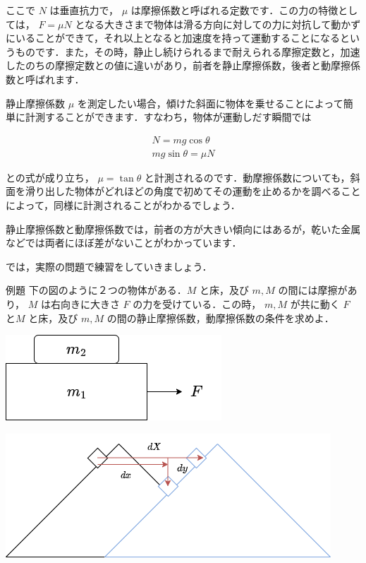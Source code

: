 \documentclass[
  b4paperpaper,
  xelatex,ja=standard]{bxjsbook}
\begin{document}
ここで \(N\) は垂直抗力で， \(\mu\)
は摩擦係数と呼ばれる定数です．この力の特徴としては， \(F=\mu N\)
となる大きさまで物体は滑る方向に対しての力に対抗して動かずにいることができて，それ以上となると加速度を持って運動することになるというものです．また，その時，静止し続けられるまで耐えられる摩擦定数と，加速したのちの摩擦定数との値に違いがあり，前者を静止摩擦係数，後者と動摩擦係数と呼ばれます．

静止摩擦係数 \(\mu\)
を測定したい場合，傾けた斜面に物体を乗せることによって簡単に計測することができます．すなわち，物体が運動しだす瞬間では

\begin{align*}
N= mg\cos \theta \\
mg \sin \theta=\mu N
\end{align*}

との式が成り立ち， \(\mu = \tan \theta\)
と計測されるのです．動摩擦係数についても，斜面を滑り出した物体がどれほどの角度で初めてその運動を止めるかを調べることによって，同様に計測されることがわかるでしょう．

静止摩擦係数と動摩擦係数では，前者の方が大きい傾向にはあるが，乾いた金属などでは両者にほぼ差がないことがわかっています．

では，実際の問題で練習をしていきましょう．

\begin{Rbox}{例題}
下の図のように２つの物体がある．\(M\) と床，及び \(m,M\)
の間には摩擦があり， \(M\) は右向きに大きさ \(F\)
の力を受けている．この時， \(m,M\) が共に動く \(F\) と\(M\) と床，及び
\(m,M\) の間の静止摩擦係数，動摩擦係数の条件を求めよ．

\includegraphics{source/images/newton/newton16.png}

\end{Rbox}


\includegraphics{source/images/newton/newton15.png}
\end{document}
